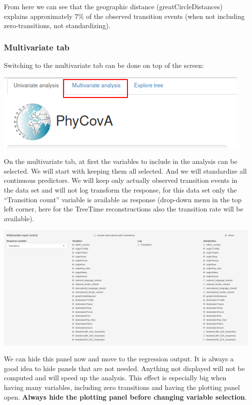 \documentclass[
]{article}
\begin{document}
From here we can see that the geographic distance (greatCircleDistances)
explains approximately 7\% of the observed transition events (when not
including zero-transitions, not standardizing).

\hypertarget{multivariate-tab}{%
\subsubsection{Multivariate tab}\label{multivariate-tab}}

Switching to the multivariate tab can be done on top of the screen:

\includegraphics{tutorial_img/Multivariate_tab.png}

On the multivariate tab, at first the variables to include in the
analysis can be selected. We will start with keeping them all selected.
And we will standardize all continuous predictors. We will keep only
actually observed transition events in the data set and will not log
transform the response, for this data set only the ``Transition count''
variable is available as response (drop-down menu in the top left
corner, here for the TreeTime reconstructions also the transition rate
will be available).

\includegraphics{tutorial_img/Variable_Selection.png}

We can hide this panel now and move to the regression output. It is
always a good idea to hide panels that are not needed. Anything not
displayed will not be computed and will speed up the analysis. This
effect is especially big when having many variables, including zero
transitions and having the plotting panel open. \textbf{Always hide the
plotting panel before changing variable selection}.
\end{document}
